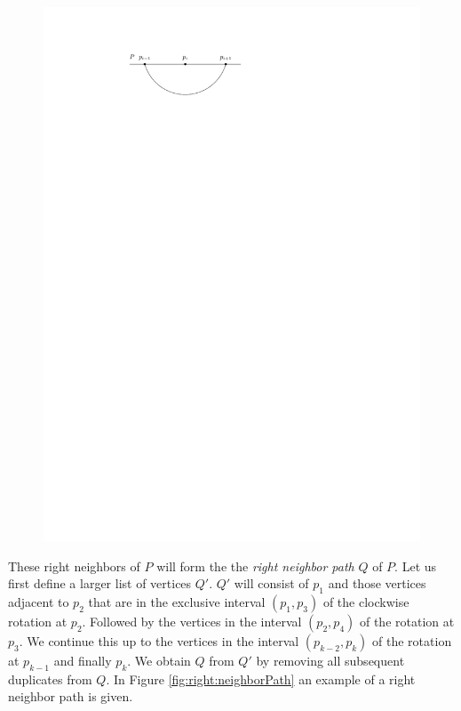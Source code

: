     \begin{figure}[h]
      \centering
      \includegraphics[scale=1]{unifiedAlgo/img/rightNeighbourwalk/pHasRightNeighbor.pdf}
      \caption{}
      \label{fig:right:pHasRightNeighbor}
    \end{figure}

    These right neighbors of $P$ will form the the \emph{right neighbor path} $Q$ of $P$.
    Let us first define a larger list of vertices $Q'$. $Q'$ will consist of $p_1$ and those vertices adjacent to $p_{2}$ that are in the exclusive interval $(p_1, p_3)$ of the clockwise rotation at $p_2$. Followed by the vertices in the interval $(p_2, p_4)$ of the rotation at $p_{3}$. We continue this up to the vertices in the interval $(p_{k-2}, p_k)$ of the rotation at $p_{k-1}$ and finally $p_k$.
    We obtain $Q$ from $Q'$ by removing all subsequent duplicates from $Q$.
    In Figure \ref{fig:right:neighborPath} an example of a right neighbor path is given.

